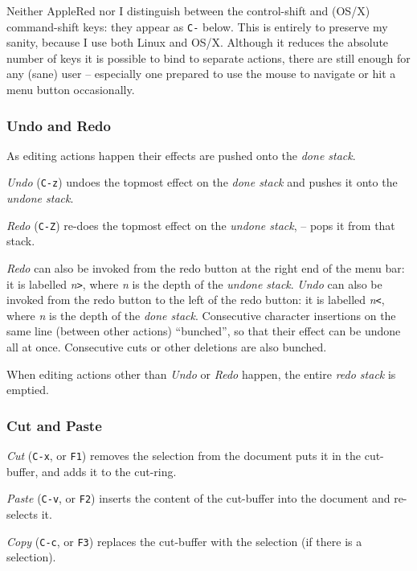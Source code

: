 \documentclass[
]{article}
\begin{document}
Neither AppleRed nor I distinguish between the control-shift and (OS/X)
command-shift keys: they appear as \texttt{C-} below. This is entirely
to preserve my sanity, because I use both Linux and OS/X. Although it
reduces the absolute number of keys it is possible to bind to separate
actions, there are still enough for any (sane) user -- especially one
prepared to use the mouse to navigate or hit a menu button occasionally.

\hypertarget{undo-and-redo}{%
\subsubsection{Undo and Redo}\label{undo-and-redo}}

As editing actions happen their effects are pushed onto the \emph{done
stack}.

\emph{Undo} (\texttt{C-z}) undoes the topmost effect on the \emph{done
stack} and pushes it onto the \emph{undone stack}.

\emph{Redo} (\texttt{C-Z}) re-does the topmost effect on the
\emph{undone stack}, -- pops it from that stack.

\emph{Redo} can also be invoked from the redo button at the right end of
the menu bar: it is labelled \emph{n}\texttt{\textgreater{}}, where
\emph{n} is the depth of the \emph{undone stack}. \emph{Undo} can also
be invoked from the redo button to the left of the redo button: it is
labelled \emph{n}\texttt{\textless{}}, where \emph{n} is the depth of
the \emph{done stack}. Consecutive character insertions on the same line
(between other actions) ``bunched'', so that their effect can be undone
all at once. Consecutive cuts or other deletions are also bunched.

When editing actions other than \emph{Undo} or \emph{Redo} happen, the
entire \emph{redo stack} is emptied.

\hypertarget{cut-and-paste}{%
\subsubsection{Cut and Paste}\label{cut-and-paste}}

\emph{Cut} (\texttt{C-x}, or \texttt{F1}) removes the selection from the
document puts it in the cut-buffer, and adds it to the cut-ring.

\emph{Paste} (\texttt{C-v}, or \texttt{F2}) inserts the content of the
cut-buffer into the document and re-selects it.

\emph{Copy} (\texttt{C-c}, or \texttt{F3}) replaces the cut-buffer with
the selection (if there is a selection).
\end{document}
